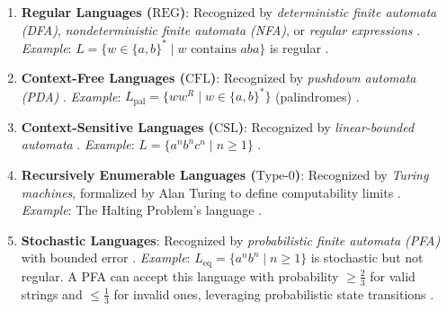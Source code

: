 \begin{enumerate}
    \item \textbf{Regular Languages ($\text{REG}$)}:  
    Recognized by \textit{deterministic finite automata (DFA)}, \textit{nondeterministic finite automata (NFA)}, or \textit{regular expressions} \cite{hopcroft2006introduction}.  
    \textit{Example}: $L = \{w \in \{a, b\}^\ast \mid w \text{ contains } aba\}$ is regular \cite{hopcroft2006introduction}.  

    \item \textbf{Context-Free Languages ($\text{CFL}$)}:  
    Recognized by \textit{pushdown automata (PDA)} \cite{chomsky1956three, hopcroft2006introduction}.  
    \textit{Example}: $L_{\text{pal}} = \{ww^R \mid w \in \{a, b\}^\ast\}$ (palindromes) \cite{chomsky1956three}.  

    \item \textbf{Context-Sensitive Languages ($\text{CSL}$)}:  
    Recognized by \textit{linear-bounded automata} \cite{chomsky1956three, hopcroft2006introduction}.  
    \textit{Example}: $L = \{a^n b^n c^n \mid n \geq 1\}$ \cite{chomsky1956three}.  

    \item \textbf{Recursively Enumerable Languages ($\text{Type-0}$)}:  
    Recognized by \textit{Turing machines}, formalized by Alan Turing to define computability limits \cite{hopcroft2006introduction}.  
    \textit{Example}: The Halting Problem’s language \cite{hopcroft2006introduction}.  

    \item \textbf{Stochastic Languages}:  
    Recognized by \textit{probabilistic finite automata (PFA)} with bounded error \cite{rabin1963probabilistic}.  
    \textit{Example}: $L_{\text{eq}} = \{a^n b^n \mid n \geq 1\}$ is stochastic but not regular. A PFA can accept this language with probability $\geq \frac{2}{3}$ for valid strings and $\leq \frac{1}{3}$ for invalid ones, leveraging probabilistic state transitions \cite{rabin1963probabilistic}.  %

    \begin{figure}[h]
        \centering
\end{figure}
\end{enumerate}
